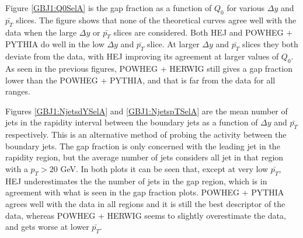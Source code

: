 Figure \ref{GBJ1:Q0SelA} is the gap fraction as a function of $Q_0$ for various $\Delta y$ and $\bar{p_T}$ slices. The figure shows that none of the theoretical curves agree well with the data when the large $\Delta y$ or $\bar{p_T}$ slices are considered. Both HEJ and POWHEG + PYTHIA do well in the low $\Delta y$ and $\bar{p_T}$ slice. At larger $\Delta y$ and $\bar{p_T}$ slices they both deviate from the data, with HEJ improving its agreement at larger values of $Q_0$. As seen in the previous figures, POWHEG + HERWIG still gives a gap fraction lower than the POWHEG + PYTHIA, and that is far from the data for all ranges. 




Figures \ref{GBJ1:NjetsdYSelA} and \ref{GBJ1:NjetspTSelA} are the mean number of jets in the rapidity interval between the boundary jets as a function of $\Delta y$ and $\bar{p_T}$ respectively. This is an alternative method of probing the activity between the boundary jets. The gap fraction is only concerned with the leading jet in the rapidity region, but the average number of jets considers all jet in that region with a $p_T>20$ GeV. In both plots it can be seen that, except at very low $\bar{p_T}$, HEJ underestimates the the number of jets in the gap region, which is in agreement with what is seen in the gap fraction plots. POWHEG + PYTHIA agrees well  with the data in all regions and it is still the best descriptor of the data, whereas POWHEG + HERWIG seems to slightly overestimate the data, and gets worse at lower $\bar{p_T}$.  

 
